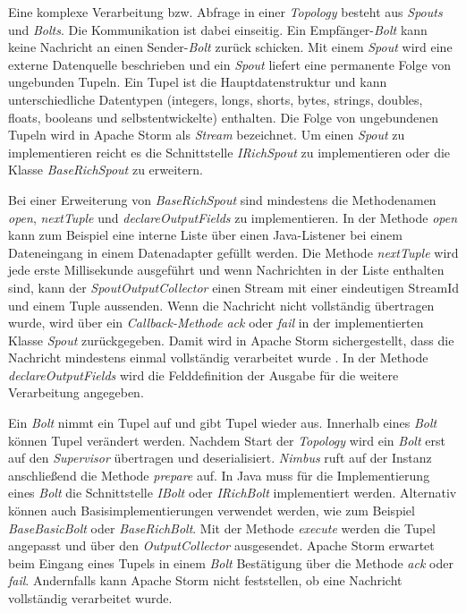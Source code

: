 Eine komplexe Verarbeitung bzw. Abfrage in einer \textit{Topology} besteht aus \textit{Spouts} und \textit{Bolts}. Die Kommunikation ist dabei einseitig. Ein Empfänger-\textit{Bolt} kann keine Nachricht an einen Sender-\textit{Bolt} zurück schicken. Mit einem \textit{Spout} wird eine externe Datenquelle beschrieben und ein \textit{Spout} liefert eine permanente Folge von ungebunden Tupeln. Ein Tupel ist die Hauptdatenstruktur und kann unterschiedliche Datentypen (integers, longs, shorts, bytes, strings, doubles, floats, booleans und selbstentwickelte) enthalten. Die Folge von ungebundenen Tupeln wird in Apache Storm als \textit{Stream} bezeichnet. Um einen \textit{Spout} zu implementieren reicht es die Schnittstelle \textit{IRichSpout} zu implementieren oder die Klasse \textit{BaseRichSpout} zu erweitern. 

Bei einer Erweiterung von \textit{BaseRichSpout} sind mindestens die Methodenamen \textit{open}, \textit{nextTuple} und \textit{declareOutputFields} zu implementieren. In der Methode \textit{open} kann zum Beispiel eine interne Liste über einen Java-Listener bei einem Dateneingang in einem Datenadapter gefüllt werden. Die Methode \textit{nextTuple} wird jede erste Millisekunde ausgeführt und wenn Nachrichten in der Liste enthalten sind, kann der \textit{SpoutOutputCollector} einen Stream mit einer eindeutigen StreamId und einem Tuple aussenden. Wenn die Nachricht nicht vollständig übertragen wurde, wird über ein \textit{Callback-Methode} \textit{ack} oder \textit{fail} in der implementierten Klasse \textit{Spout} zurückgegeben. Damit wird in Apache Storm sichergestellt, dass die Nachricht mindestens einmal vollständig verarbeitet wurde . In der Methode \textit{declareOutputFields} wird die Felddefinition der Ausgabe für die weitere Verarbeitung angegeben. 

Ein \textit{Bolt} nimmt ein Tupel auf und gibt Tupel wieder aus. Innerhalb eines \textit{Bolt} können Tupel verändert werden. Nachdem Start der \textit{Topology} wird ein \textit{Bolt} erst auf den \textit{Supervisor} übertragen und deserialisiert. \textit{Nimbus} ruft auf der Instanz anschließend die Methode \textit{prepare} auf. In Java muss für die Implementierung eines \textit{Bolt} die Schnittstelle \textit{IBolt} oder \textit{IRichBolt} implementiert werden. Alternativ können auch Basisimplementierungen verwendet werden, wie zum Beispiel \textit{BaseBasicBolt} oder \textit{BaseRichBolt}. Mit der Methode \textit{execute} werden die Tupel angepasst und über den \textit{OutputCollector} ausgesendet. Apache Storm erwartet beim Eingang eines Tupels in einem \textit{Bolt} Bestätigung über die Methode \textit{ack} oder \textit{fail}. Andernfalls kann Apache Storm nicht feststellen, ob eine Nachricht vollständig verarbeitet wurde. 

